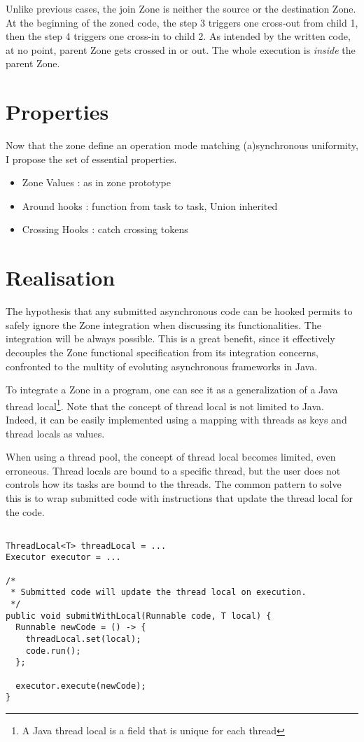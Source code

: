 Unlike previous cases, the join Zone is neither the source or the destination Zone. At the beginning of the zoned code, the step 3 triggers one cross-out from child 1, then the step 4 triggers one cross-in to child 2. As intended by the written code, at no point, parent Zone gets crossed in or out. The whole execution is \emph{inside} the parent Zone.


\section{Properties} %

Now that the zone define an operation mode matching (a)synchronous uniformity, I propose the set of essential properties.

\begin{itemize}
\item Zone Values : as in zone prototype
\item Around hooks : function from task to task, Union inherited
\item Crossing Hooks : catch crossing tokens
\end{itemize}

\section{Realisation}

The hypothesis that any submitted asynchronous code can be hooked permits to safely ignore the Zone integration when discussing its functionalities. The integration will be always possible. This is a great benefit, since it effectively decouples the Zone functional specification from its integration concerns, confronted to the multity of evoluting asynchronous frameworks in Java.

To integrate a Zone in a program, one can see it as a generalization of a Java thread local\footnote{A Java thread local is a field that is unique for each thread}. Note that the concept of thread local is not limited to Java. Indeed, it can be easily implemented using a mapping with threads as keys and thread locals as values.

When using a thread pool, the concept of thread local becomes limited, even erroneous. Thread locals are bound to a specific thread, but the user does not controls how its tasks are bound to the threads. The common pattern to solve this is to wrap submitted code with instructions that update the thread local for the code.
\begin{lstlisting}

ThreadLocal<T> threadLocal = ...
Executor executor = ...

/*
 * Submitted code will update the thread local on execution.
 */
public void submitWithLocal(Runnable code, T local) {
  Runnable newCode = () -> {
    threadLocal.set(local);
    code.run();
  };

  executor.execute(newCode);
}
\end{lstlisting}

